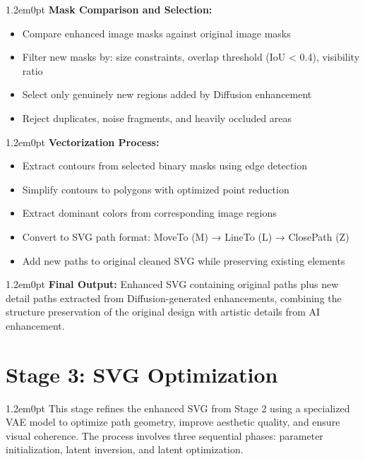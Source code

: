 \documentclass[10pt,a4paper]{article}
\newenvironment{bodytext}{\begin{adjustwidth}{1.2em}{0pt}}{\end{adjustwidth}}
\begin{document}
\begin{bodytext}
\textbf{Mask Comparison and Selection:}
\begin{itemize}
\item Compare enhanced image masks against original image masks
\item Filter new masks by: size constraints, overlap threshold (IoU < 0.4), visibility ratio
\item Select only genuinely new regions added by Diffusion enhancement
\item Reject duplicates, noise fragments, and heavily occluded areas
\end{itemize}
\end{bodytext}

\begin{bodytext}
\textbf{Vectorization Process:}
\begin{itemize}
\item Extract contours from selected binary masks using edge detection
\item Simplify contours to polygons with optimized point reduction
\item Extract dominant colors from corresponding image regions
\item Convert to SVG path format: MoveTo (M) → LineTo (L) → ClosePath (Z)
\item Add new paths to original cleaned SVG while preserving existing elements
\end{itemize}
\end{bodytext}

\begin{bodytext}
\textbf{Final Output:} Enhanced SVG containing original paths plus new detail paths extracted from Diffusion-generated enhancements, combining the structure preservation of the original design with artistic details from AI enhancement.
\end{bodytext}

\section{Stage 3: SVG Optimization}

\begin{bodytext}
This stage refines the enhanced SVG from Stage 2 using a specialized VAE model to optimize path geometry, improve aesthetic quality, and ensure visual coherence. The process involves three sequential phases: parameter initialization, latent inversion, and latent optimization.
\end{bodytext}
\end{document}
